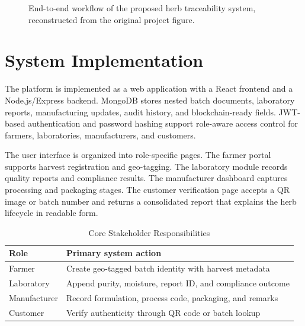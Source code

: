 \documentclass[conference]{IEEEtran}
\begin{document}
\begin{figure}[!t]
\centering
{}
\caption{End-to-end workflow of the proposed herb traceability system, reconstructed from the original project figure.}
\label{fig:workflow}
\end{figure}

\section{System Implementation}

The platform is implemented as a web application with a React frontend and a Node.js/Express backend. MongoDB stores nested batch documents, laboratory reports, manufacturing updates, audit history, and blockchain-ready fields. JWT-based authentication and password hashing support role-aware access control for farmers, laboratories, manufacturers, and customers.

The user interface is organized into role-specific pages. The farmer portal supports harvest registration and geo-tagging. The laboratory module records quality reports and compliance results. The manufacturer dashboard captures processing and packaging stages. The customer verification page accepts a QR image or batch number and returns a consolidated report that explains the herb lifecycle in readable form.

\begin{table}[!t]
\caption{Core Stakeholder Responsibilities}
\label{tab:roles}
\centering
\scriptsize
\begin{tabular}{p{1.7cm} p{5.4cm}}
\toprule
Role & Primary system action \\
\midrule
Farmer & Create geo-tagged batch identity with harvest metadata \\
Laboratory & Append purity, moisture, report ID, and compliance outcome \\
Manufacturer & Record formulation, process code, packaging, and remarks \\
Customer & Verify authenticity through QR code or batch lookup \\
\bottomrule
\end{tabular}
\end{table}
\end{document}
